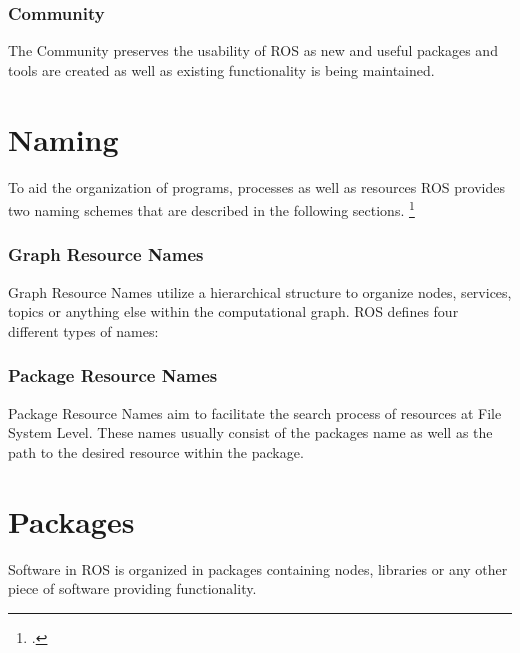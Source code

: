 \subsubsection{Community}
The Community preserves the usability of ROS as new and useful packages and tools are created as well as existing functionality is being maintained.

\section{Naming}
To aid the organization of programs, processes as well as resources ROS provides two naming schemes that are described in the following sections. \citereset\footcite{openSourceRoboticsFoundationConceptsNodate}

\subsubsection{Graph Resource Names}
Graph Resource Names utilize a hierarchical structure to organize nodes, services, topics or anything else within the computational graph. ROS defines four different types of names:

\subsubsection{Package Resource Names}
Package Resource Names aim to facilitate the search process of resources at File System Level. These names usually consist of the packages name as well as the path to the desired resource within the package. 

\section{Packages}
Software in ROS is organized in packages containing nodes, libraries or any other piece of software providing functionality.

